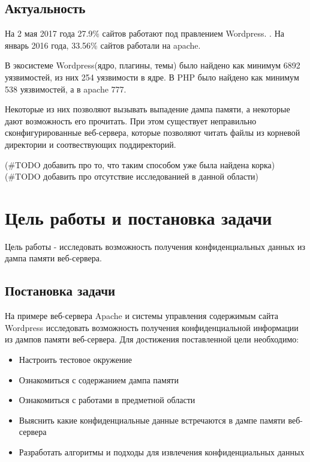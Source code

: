 \documentclass[20pt]{article}
\begin{document}
\subsection{Актуальность}
На 2 мая 2017 года 27.9\% сайтов работают под правлением Wordpress.
\cite{number_of_wordpress_sites}. На январь 2016 года, 33.56\% сайтов работали
на apache\cite{number_of_apache_sites}.

В экосистеме Wordpress(ядро, плагины, темы) было найдено как минимум 6892
уязвимостей\cite{wordpress/vulnerablilities-list-all}, из них 254
уязвимости\cite{wordpress/vulnerabilities-list-core} в ядре. В PHP было
найдено как минимум 538\cite{php/vulnerabilities-list} уязвимостей, а в apache
777\cite{apache/vulnerabilities-list}.

Некоторые из них позволяют вызывать выпадение дампа памяти, а некоторые дают
возможность его прочитать. При этом существует неправильно сконфигурированные
веб-сервера, которые позволяют читать файлы из корневой директории и
соотвествующих поддиректорий.

(\#TODO добавить про то, что таким способом уже была найдена корка)
(\#TODO добавить про отсутствие исследованией в данной области)

\newpage

\section{Цель работы и постановка задачи}

Цель работы - исследовать возможность получения конфиденциальных данных из
дампа памяти веб-сервера.

\subsection{Постановка задачи}

На примере веб-сервера Apache и системы управления содержимым сайта Wordpress
исследовать возможность получения конфиденциальной информации из дампов памяти
веб-сервера. Для достижения поставленной цели необходимо:

\begin{itemize}
  \item Настроить тестовое окружение
  \item Ознакомиться с содержанием дампа памяти
  \item Ознакомиться с работами в предметной области
  \item Выяснить какие конфиденциальные данные встречаются в дампе памяти веб-сервера
  \item Разработать алгоритмы и подходы для извлечения конфиденциальных данных
\end{itemize}
\end{document}
